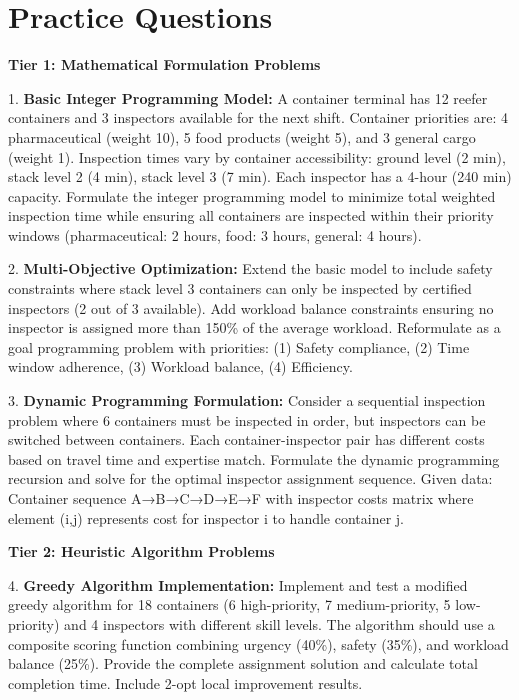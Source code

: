 \documentclass{article}
\begin{document}
\section{Practice Questions}

\textbf{Tier 1: Mathematical Formulation Problems}

1. \textbf{Basic Integer Programming Model:} A container terminal has 12 reefer containers and 3 inspectors available for the next shift. Container priorities are: 4 pharmaceutical (weight 10), 5 food products (weight 5), and 3 general cargo (weight 1). Inspection times vary by container accessibility: ground level (2 min), stack level 2 (4 min), stack level 3 (7 min). Each inspector has a 4-hour (240 min) capacity. Formulate the integer programming model to minimize total weighted inspection time while ensuring all containers are inspected within their priority windows (pharmaceutical: 2 hours, food: 3 hours, general: 4 hours).

2. \textbf{Multi-Objective Optimization:} Extend the basic model to include safety constraints where stack level 3 containers can only be inspected by certified inspectors (2 out of 3 available). Add workload balance constraints ensuring no inspector is assigned more than 150\% of the average workload. Reformulate as a goal programming problem with priorities: (1) Safety compliance, (2) Time window adherence, (3) Workload balance, (4) Efficiency.

3. \textbf{Dynamic Programming Formulation:} Consider a sequential inspection problem where 6 containers must be inspected in order, but inspectors can be switched between containers. Each container-inspector pair has different costs based on travel time and expertise match. Formulate the dynamic programming recursion and solve for the optimal inspector assignment sequence. Given data: Container sequence A→B→C→D→E→F with inspector costs matrix where element (i,j) represents cost for inspector i to handle container j.

\textbf{Tier 2: Heuristic Algorithm Problems}

4. \textbf{Greedy Algorithm Implementation:} Implement and test a modified greedy algorithm for 18 containers (6 high-priority, 7 medium-priority, 5 low-priority) and 4 inspectors with different skill levels. The algorithm should use a composite scoring function combining urgency (40\%), safety (35\%), and workload balance (25\%). Provide the complete assignment solution and calculate total completion time. Include 2-opt local improvement results.
\end{document}
